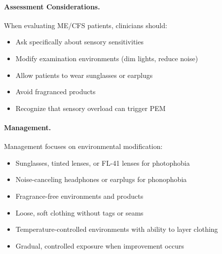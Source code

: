 \paragraph{Assessment Considerations.}
When evaluating ME/CFS patients, clinicians should:
\begin{itemize}
    \item Ask specifically about sensory sensitivities
    \item Modify examination environments (dim lights, reduce noise)
    \item Allow patients to wear sunglasses or earplugs
    \item Avoid fragranced products
    \item Recognize that sensory overload can trigger PEM
\end{itemize}

\paragraph{Management.}
Management focuses on environmental modification:
\begin{itemize}
    \item Sunglasses, tinted lenses, or FL-41 lenses for photophobia
    \item Noise-canceling headphones or earplugs for phonophobia
    \item Fragrance-free environments and products
    \item Loose, soft clothing without tags or seams
    \item Temperature-controlled environments with ability to layer clothing
    \item Gradual, controlled exposure when improvement occurs
\end{itemize}

